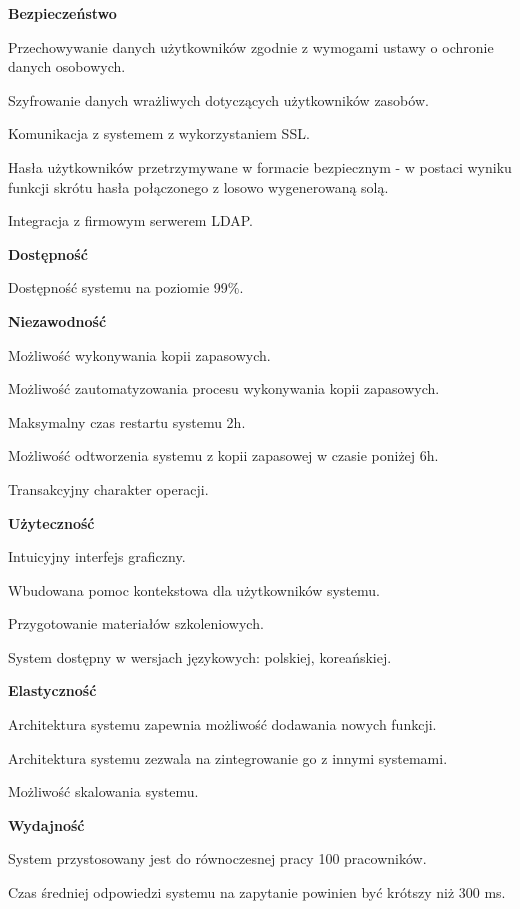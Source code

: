\begin{myEnumerate}
	\item \textbf{Bezpieczeństwo}
	\begin{myEnumerate}
		\item Przechowywanie danych użytkowników zgodnie z wymogami ustawy o ochronie danych osobowych.
		\item Szyfrowanie danych wrażliwych dotyczących użytkowników zasobów.
		\item Komunikacja z systemem z wykorzystaniem SSL.
		\item Hasła użytkowników przetrzymywane w formacie bezpiecznym - w postaci wyniku funkcji skrótu hasła połączonego z losowo wygenerowaną solą.
		\item Integracja z firmowym serwerem LDAP.
	\end{myEnumerate}
	\item \textbf{Dostępność}
	\begin{myEnumerate}
		\item Dostępność systemu na poziomie 99\%.
	\end{myEnumerate}
	\item \textbf{Niezawodność}
	\begin{myEnumerate}
		\item Możliwość wykonywania kopii zapasowych.
		\item Możliwość zautomatyzowania procesu wykonywania kopii zapasowych.
		\item Maksymalny czas restartu systemu 2h.
		\item Możliwość odtworzenia systemu z kopii zapasowej w czasie poniżej 6h.
		\item Transakcyjny charakter operacji.
	\end{myEnumerate}
	\item \textbf{Użyteczność}
	\begin{myEnumerate}
		\item Intuicyjny interfejs graficzny.
		\item Wbudowana pomoc kontekstowa dla użytkowników systemu.
		\item Przygotowanie materiałów szkoleniowych.
		\item System dostępny w wersjach językowych: polskiej, koreańskiej.
	\end{myEnumerate}
	\item \textbf{Elastyczność}
	\begin{myEnumerate}
		\item Architektura systemu zapewnia możliwość dodawania nowych funkcji.
		\item Architektura systemu zezwala na zintegrowanie go z innymi systemami.
		\item Możliwość skalowania systemu.
	\end{myEnumerate}
	\item \textbf{Wydajność}
	\begin{myEnumerate}
		\item System przystosowany jest do równoczesnej pracy 100 pracowników.
		\item Czas średniej odpowiedzi systemu na zapytanie powinien być krótszy niż 300 ms.
	\end{myEnumerate}
\end{myEnumerate}

